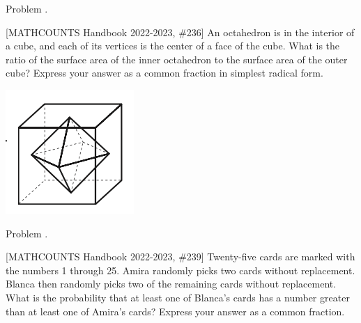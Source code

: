 \documentclass[9pt]{beamer}
\newcounter{problem}[section]
\begin{document}
\begin{frame}[t, fragile]{Problem \thesection.\theproblem}
    \begin{block}{}[MATHCOUNTS Handbook 2022-2023, \#236]
    An octahedron is in the interior of a cube, and each of its vertices is the center of a face of the cube. What is the ratio of the surface area of the inner octahedron to the surface area of the outer cube? Express your answer as a common fraction in simplest radical form.
    \end{block}
    \begin{center}
        \includegraphics[]{hb_22_236}
    \end{center}

\end{frame}

\begin{frame}[t, fragile]{Problem \thesection.\theproblem}
    \begin{block}{}[MATHCOUNTS Handbook 2022-2023, \#239]
    Twenty-five cards are marked with the numbers 1 through 25. Amira randomly picks two cards without replacement. Blanca then randomly picks two of the remaining cards without replacement. What is the probability that at least one of Blanca’s cards has a number greater than at least one of Amira’s cards?
Express your answer as a common fraction.
    
	
    \end{block}
\end{frame}
\end{document}
